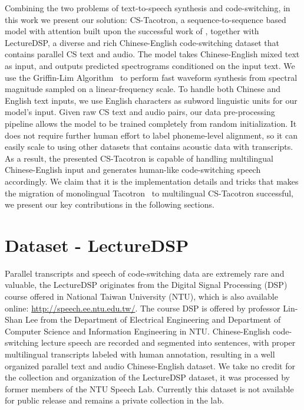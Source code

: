 \documentclass{article} %
\begin{document}
\begin{CJK}{UTF8}{bsmi}
Combining the two problems of text-to-speech synthesis and code-switching, in this work we present our solution: CS-Tacotron, a sequence-to-sequence based model with attention built upon the successful work of \citet{Wang2017}, together with LectureDSP, a diverse and rich Chinese-English code-switching dataset that contains parallel CS text and audio. The model takes Chinese-English mixed text as input, and outputs predicted spectrograms conditioned on the input text. We use the Griffin-Lim Algorithm~\citep{Griffin11984} to perform fast waveform synthesis from spectral magnitude sampled on a linear-frequency scale. To handle both Chinese and English text inputs, we use English characters as subword linguistic units for our model's input. Given raw CS text and audio pairs, our data pre-processing pipeline allows the model to be trained completely from random initialization. It does not require further human effort to label phoneme-level alignment, so it can easily scale to using other datasets that contains acoustic data with transcripts. As a result, the presented CS-Tacotron is capable of handling multilingual Chinese-English input and generates human-like code-switching speech accordingly. We claim that it is the implementation details and tricks that makes the migration of monolingual Tacotron~\citep{Wang2017} to multilingual CS-Tacotron successful, we present our key contributions in the following sections.

\section{Dataset - LectureDSP}
Parallel transcripts and speech of code-switching data are extremely rare and valuable, the LectureDSP originates from the Digital Signal Processing (DSP) course offered in National Taiwan University (NTU), which is also available online: \url{http://speech.ee.ntu.edu.tw/}. The course DSP is offered by professor Lin-Shan Lee from the Department of Electrical Engineering and Department of Computer Science and Information Engineering in NTU. Chinese-English code-switching lecture speech are recorded and segmented into sentences, with proper multilingual transcripts labeled with human annotation, resulting in a well organized parallel text and audio Chinese-English dataset. We take no credit for the collection and organization of the LectureDSP dataset, it was processed by former members of the NTU Speech Lab. Currently this dataset is not available for public release and remains a private collection in the lab.


\end{CJK}
\end{document}
